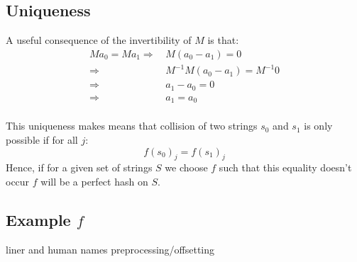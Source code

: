 \subsection{Uniqueness}
A useful consequence of the invertibility of $M$ is that:
\begin{equation*}
\begin{aligned}
	Ma_0 = Ma_1 \Rightarrow\,& M(a_0-a_1) = 0 \\
	\Rightarrow\,& M^{-1}M(a_0-a_1) = M^{-1}0 \\
	\Rightarrow\,& a_1-a_0 = 0\\
	\Rightarrow\,& a_1=a_0\\
\end{aligned}
\end{equation*}

This uniqueness makes means that collision of two strings $s_0$ and $s_1$ is only possible if for all $j$:
\[f(s_0)_j=f(s_1)_j\]
Hence,
if for a given set of strings $S$ we choose $f$ such that this equality doesn't occur $f$ will be a perfect hash on $S$.

\subsection{Example $f$}
liner and human names
preprocessing/offsetting
